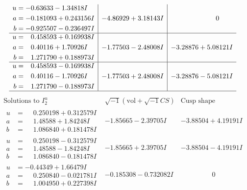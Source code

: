 \documentclass[1p]{elsarticle_modified}
\theoremstyle{definition}
\newcommand{\I}{\sqrt{-1}}
\begin{document}
$$\begin{array}{c|c|c}
\begin{aligned}
u &= -0.63633 - 1.34818 I \\
a &= -0.181093 + 0.243156 I \\
b &= -0.925507 - 0.236497 I\end{aligned}
 & -4.86929 + 3.18143 I & \phantom{-0.000000 } 0 \\ \hline\begin{aligned}
u &= \phantom{-}0.458593 + 0.169938 I \\
a &= \phantom{-}0.40116 + 1.70926 I \\
b &= \phantom{-}1.271790 + 0.188973 I\end{aligned}
 & -1.77503 - 2.48008 I & -3.28876 + 5.08121 I \\ \hline\begin{aligned}
u &= \phantom{-}0.458593 - 0.169938 I \\
a &= \phantom{-}0.40116 - 1.70926 I \\
b &= \phantom{-}1.271790 - 0.188973 I\end{aligned}
 & -1.77503 + 2.48008 I & -3.28876 - 5.08121 I\\
 \hline 
 \end{array}$$\newpage$$\begin{array}{c|c|c}  
\text{Solutions to }I^u_{2}& \I (\text{vol} + \sqrt{-1}CS) & \text{Cusp shape}\\
 \hline 
\begin{aligned}
u &= \phantom{-}0.250198 + 0.312579 I \\
a &= \phantom{-}1.48588 + 1.84248 I \\
b &= \phantom{-}1.086840 + 0.181478 I\end{aligned}
 & -1.85665 - 2.39705 I & -3.88504 + 4.19191 I \\ \hline\begin{aligned}
u &= \phantom{-}0.250198 - 0.312579 I \\
a &= \phantom{-}1.48588 - 1.84248 I \\
b &= \phantom{-}1.086840 - 0.181478 I\end{aligned}
 & -1.85665 + 2.39705 I & -3.88504 - 4.19191 I \\ \hline\begin{aligned}
u &= -0.44349 + 1.66479 I \\
a &= \phantom{-}0.250840 - 0.021781 I \\
b &= \phantom{-}1.004950 + 0.227398 I\end{aligned}
 & -0.185308 - 0.732082 I & \phantom{-0.000000 } 0 \\ \hline\begin{aligned}

\end{aligned}
\end{array}$$
\end{document}
